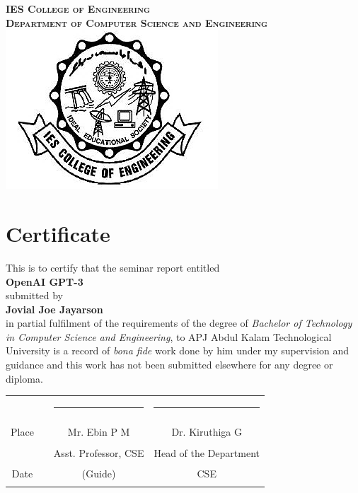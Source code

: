 \documentclass[12pt, a4paper]{report}
\begin{document}
\newpage
\thispagestyle{plain}
\vspace*{\fill}
\begin{center}
    \textbf{\textsc{IES College of Engineering}}\\[0.5cm]
    \textbf{\textsc{Department of Computer Science and Engineering}}\\[1cm]
    \includegraphics{iesce.png}
    \section*{Certificate}
    This is to certify that the seminar report entitled \\[0.3cm] \textbf{\large OpenAI GPT-3} \\[0.3cm] submitted by \\[0.3cm] \textbf{Jovial Joe Jayarson} \\[0.3cm] in partial fulfilment of the requirements of the degree of \emph{Bachelor of Technology in Computer Science and Engineering}, to APJ Abdul Kalam Technological University is a record of \emph{bona fide}  work done by him under my supervision and guidance and this work has not been submitted elsewhere for any degree or diploma. \\ [2cm]
\end{center}

\begin{table}[h]
    \centering
    \begin{tabular}{ c c c c }
              &                    & \rule{5cm}{0.15mm}   & \rule{5cm}{0.15mm}     \\
        Place & \rule{2cm}{0.15mm} & Mr. Ebin P M         & Dr. Kiruthiga G        \\
              &                    & Asst. Professor, CSE & Head of the Department \\
        Date  & \rule{2cm}{0.15mm} & (Guide)              & CSE                    \\
    \end{tabular}
\end{table}
\vspace*{\fill}
\end{document}
